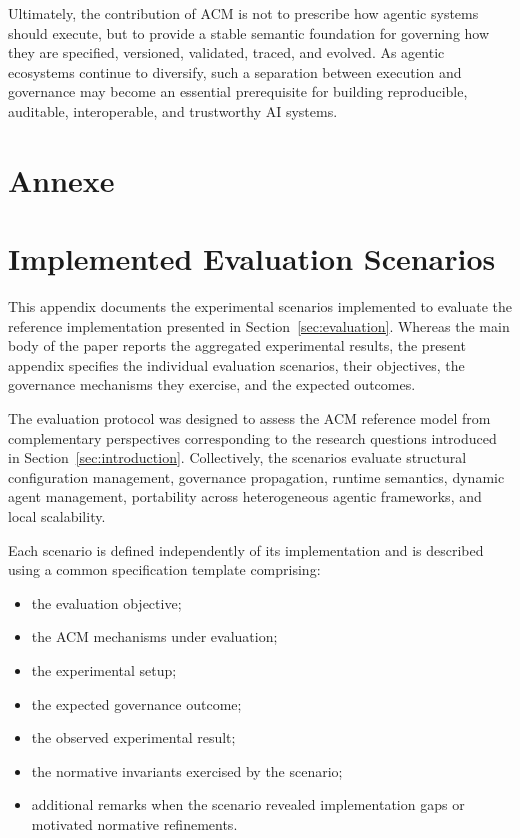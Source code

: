 \documentclass[10pt]{article}
\begin{document}
Ultimately, the contribution of ACM is not to prescribe how agentic systems should execute, but to provide a stable semantic foundation for governing how they are specified, versioned, validated, traced, and evolved. As agentic ecosystems continue to diversify, such a separation between execution and governance may become an essential prerequisite for building reproducible, auditable, interoperable, and trustworthy AI systems.

\section{Annexe}
\label{sec:annexe}
\appendices
\section{Implemented Evaluation Scenarios}
\label{appendix:evaluation_scenarios}

This appendix documents the experimental scenarios implemented to evaluate the
reference implementation presented in Section~\ref{sec:evaluation}. Whereas the
main body of the paper reports the aggregated experimental results, the present
appendix specifies the individual evaluation scenarios, their objectives, the
governance mechanisms they exercise, and the expected outcomes.

The evaluation protocol was designed to assess the ACM reference model from
complementary perspectives corresponding to the research questions introduced in
Section~\ref{sec:introduction}. Collectively, the scenarios evaluate structural
configuration management, governance propagation, runtime semantics, dynamic
agent management, portability across heterogeneous agentic frameworks, and
local scalability.

Each scenario is defined independently of its implementation and is described
using a common specification template comprising:

\begin{itemize}
    \item the evaluation objective;
    \item the ACM mechanisms under evaluation;
    \item the experimental setup;
    \item the expected governance outcome;
    \item the observed experimental result;
    \item the normative invariants exercised by the scenario;
    \item additional remarks when the scenario revealed implementation gaps or
          motivated normative refinements.
\end{itemize}
\end{document}
